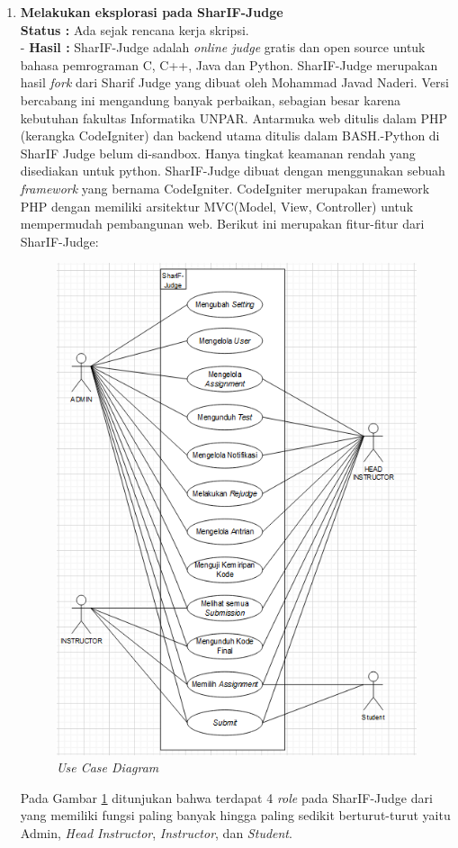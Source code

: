 \documentclass[a4paper,twoside]{article}
\begin{document}
\begin{enumerate}
	    \item \textbf{Melakukan eksplorasi pada  SharIF-Judge}\\
		{\bf Status :} Ada sejak rencana kerja skripsi.\\
-		{\bf Hasil :} SharIF-Judge adalah \textit{online judge} gratis dan open source untuk bahasa pemrograman C, C++, Java dan Python. SharIF-Judge merupakan hasil \textit{fork} dari Sharif Judge yang dibuat oleh Mohammad Javad Naderi. Versi bercabang ini mengandung banyak perbaikan, sebagian besar karena kebutuhan fakultas Informatika UNPAR. Antarmuka web ditulis dalam PHP (kerangka CodeIgniter) dan backend utama ditulis dalam BASH.-Python di SharIF Judge belum di-sandbox. Hanya tingkat keamanan rendah yang disediakan untuk python. SharIF-Judge dibuat dengan menggunakan sebuah \textit{framework} yang bernama CodeIgniter. CodeIgniter merupakan framework PHP dengan memiliki arsitektur MVC(Model, View, Controller) untuk mempermudah pembangunan web. Berikut ini merupakan fitur-fitur dari SharIF-Judge:
\begin{figure}[h!]
     \centering
     \includegraphics[width=0.5\linewidth]{Gambar/Usecase Diagram.PNG}
     \caption{\textit{Use Case Diagram}}
     \label{fig:Use Case Diagram}
 \end{figure}\newline
Pada Gambar \ref{fig:Use Case Diagram} ditunjukan bahwa terdapat 4 \textit{role} pada SharIF-Judge dari yang memiliki fungsi paling banyak hingga paling sedikit berturut-turut yaitu Admin, \textit{Head Instructor}, \textit{Instructor}, dan \textit{Student}.


\end{enumerate}
\end{document}

